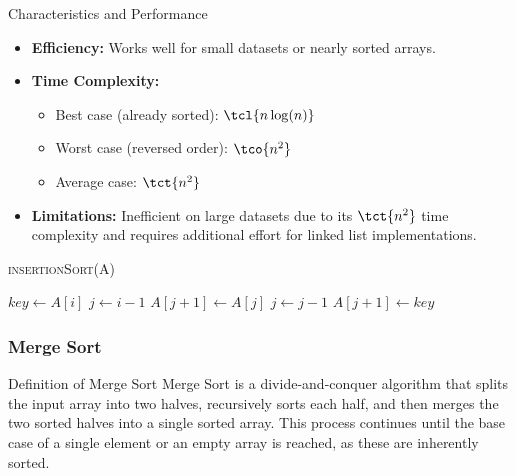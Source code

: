 \begin{properties}[]{Characteristics and Performance}
    \begin{itemize}
        \item \textbf{Efficiency:} Works well for small datasets or nearly sorted arrays.
        \item \textbf{Time Complexity:}
              \begin{itemize}
                  \item Best case (already sorted): $\tcl{n\log(n)}$
                  \item Worst case (reversed order): $\tco{n^2}$
                  \item Average case: $\tct{n^2}$
              \end{itemize}
        \item \textbf{Limitations:} Inefficient on large datasets due to its $\tct{n^2}$ time complexity and requires additional effort for linked list implementations.
    \end{itemize}
\end{properties}

\begin{algorithm}
    \begin{spacing}{1.2}
        \caption{\textsc{insertionSort(A)}}
        \begin{algorithmic}[1]
                 
                    \State $key \gets A[i]$ 
                    \State $j \gets i - 1$
                        \State $A[j+1] \gets A[j]$ 
                        \State $j \gets j - 1$
                    \EndWhile
                    \State $A[j+1] \gets key$ 
                \EndFor
            \EndProcedure
        \end{algorithmic}
    \end{spacing}
\end{algorithm}




\newpage
\subsubsection{Merge Sort}
\begin{definition}[]{Definition of Merge Sort}
    Merge Sort is a divide-and-conquer algorithm that splits the input array into two halves, recursively sorts each half, and then merges the two sorted halves into a single sorted array. This process continues until the base case of a single element or an empty array is reached, as these are inherently sorted.
\end{definition}

